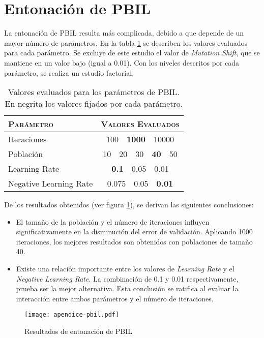 \section{Entonación de PBIL}

La entonación de PBIL resulta más complicada, debido a que depende de un mayor número de parámetros. En la tabla \ref{table-ap-pbil} se describen los valores evaluados para cada parámetro. Se excluye de este estudio el valor de \emph{Mutation Shift}, que se mantiene en un valor bajo (igual a 0.01). Con los niveles descritos por cada parámetro, se realiza un estudio factorial.

\begin{table}[h!]
\centering
\begin{tabular}{l c}
\hline
\textsc{Parámetro} & \textsc{Valores Evaluados} \\
\hline
\hline
Iteraciones & 100\ \ \textbf{1000}\ \ 10000 \\
Población   & 10\ \ 20\ \ 30\ \ \textbf{40}\ \ 50 \\
Learning Rate & \textbf{0.1}\ \ 0.05\ \ 0.01 \\
Negative Learning Rate & 0.075\ \ 0.05\ \ \textbf{0.01} \\
\hline
\end{tabular}
\caption[Valores evaluados para los parámetros de PBIL]{Valores evaluados para los parámetros de PBIL.\\En negrita los valores fijados por cada parámetro.}
\label{table-ap-pbil}
\end{table}

De los resultados obtenidos (ver figura \ref{fig-ap-pbil}), se derivan las siguientes conclusiones:
\begin{itemize}
\item El tamaño de la población y el número de iteraciones influyen significativamente en la disminución del error de validación. Aplicando 1000 iteraciones, los mejores resultados son obtenidos con poblaciones de tamaño 40.
\item Existe una relación importante entre los valores de \emph{Learning Rate} y el \emph{Negative Learning Rate}. La combinación de 0.1 y 0.01 respectivamente, prueba ser la mejor alternativa. Esta conclusión se ratifica al evaluar la interacción entre ambos parámetros y el número de iteraciones.
\end{itemize}

\begin{figure}[h!]
\centering
\texttt{[image: apendice-pbil.pdf]}
\caption{Resultados de entonación de PBIL}
\label{fig-ap-pbil}
\end{figure}

